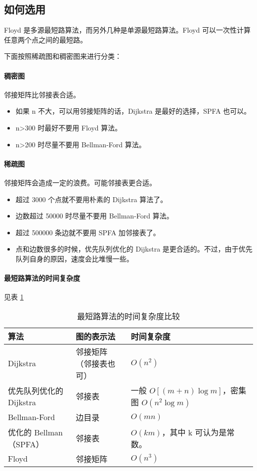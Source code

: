 \subsection{如何选用}
	Floyd 是多源最短路算法，而另外几种是单源最短路算法。Floyd 可以一次性计算任意两个点之间的最短路。
	
	下面按照稀疏图和稠密图来进行分类：
	
	\paragraph{稠密图} 邻接矩阵比邻接表合适。
	\begin{itemize}
		\item 如果 n 不大，可以用邻接矩阵的话，Dijkstra 是最好的选择，SPFA 也可以。
		\item n>300 时最好不要用 Floyd 算法。
		\item n>200 时尽量不要用 Bellman-Ford 算法。
	\end{itemize}
	
	\paragraph{稀疏图} 邻接矩阵会造成一定的浪费。可能邻接表更合适。
	
	\begin{itemize}
		\item 超过 3000 个点就不要用朴素的 Dijkstra 算法了。
		\item 边数超过 50000 时尽量不要用 Bellman-Ford 算法。
		\item 超过 500000 条边就不要用 SPFA 加邻接表了。
		\item 点和边数很多的时候，优先队列优化的 Dijkstra 是更合适的。不过，由于优先队列自身的原因，速度会比堆慢一些。
	\end{itemize}
	
	\paragraph{最短路算法的时间复杂度} 见表 \ref{tab:ch5_zdl}
	
	\begin{table}[htb]
		\centering
		\begin{tabular}{lll}
			\toprule
			算法  &  图的表示法  &  时间复杂度	\\
			\midrule
			Dijkstra &	邻接矩阵（邻接表也可） &	$O(n^{2})$	\\
			优先队列优化的 Dijkstra &	邻接表 &	一般 $O[(m+n)\log m]$，密集图 $O(n^{2}\log m)$ \\
			Bellman-Ford &	边目录 &	$O(mn)$	\\
			优化的 Bellman（SPFA）	& 邻接表 &	$O(km)$，其中 k 可认为是常数。	\\
			Floyd &	邻接矩阵 &	$O(n^{3})$	\\
			\bottomrule
		\end{tabular}
		\label{tab:ch5_zdl}
		\caption{最短路算法的时间复杂度比较}
	\end{table}
	
